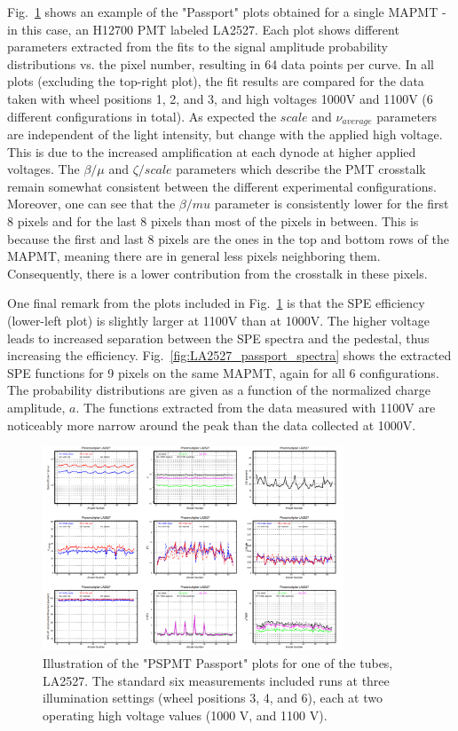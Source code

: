 Fig.~\ref{fig:LA2527_passport} shows an example of the "Passport" plots obtained for a single MAPMT - in this case, an H12700 PMT labeled LA2527. 
Each plot shows different parameters extracted from the fits to the signal amplitude probability distributions vs. the pixel number, resulting in 64 data points per curve.
In all plots (excluding the top-right plot), the fit results are compared for the data taken with wheel positions 1, 2, and 3, and high voltages 1000V and 1100V (6 different configurations in total).
As expected the $scale$ and $\nu_{average}$ parameters are independent of the light intensity, but change with the applied high voltage. 
This is due to the increased amplification at each dynode at higher applied voltages.
The $\beta/\mu$ and $\zeta/scale$ parameters which describe the PMT crosstalk remain somewhat consistent between the different experimental configurations. 
Moreover, one can see that the $\beta/mu$ parameter is consistently lower for the first 8 pixels and for the last 8 pixels than most of the pixels in between.
This is because the first and last 8 pixels are the ones in the top and bottom rows of the MAPMT, meaning there are in general less pixels neighboring them.
Consequently, there is a lower contribution from the crosstalk in these pixels.

One final remark from the plots included in Fig.~\ref{fig:LA2527_passport} is that the SPE efficiency (lower-left plot) is slightly larger at 1100V than at 1000V. The higher voltage leads to increased separation between the SPE spectra and the pedestal, thus increasing the efficiency. 
Fig.~\ref{fig:LA2527_passport_spectra} shows the extracted SPE functions for 9 pixels on the same MAPMT, again for all 6 configurations. The probability distributions are given as a function of the normalized charge amplitude, $a$. The functions extracted from the data measured with 1100V are noticeably more narrow around the peak than the data collected at 1000V.

\begin{figure}[p]
	\centering
	\includegraphics[width=0.8\textwidth]{figures/pavel_temp/LA2527_passport_temp.png}
	\caption{Illustration of the "PSPMT Passport" plots for one of the tubes, LA2527. The standard six measurements included runs at three illumination settings (wheel positions 3, 4, and 6), each at two operating high voltage values (1000 V, and 1100 V).}
	\label{fig:LA2527_passport}
\end{figure}

